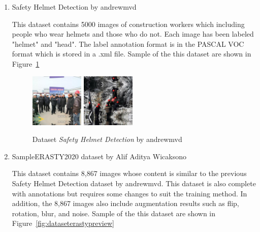 \begin{enumerate}
  \item Safety Helmet Detection by andrewmvd
  \par This dataset contains 5000 images of construction workers which including people who wear helmets and those who do not.  Each image has been labeled "helmet" and "head". The label annotation format is in the PASCAL VOC format which is stored in a .xml file. Sample of the this dataset are shown in Figure~\ref{fig:datasethelmetdetectionpreview}

  \begin{figure}[ht]
    \centering
    \includegraphics[width=0.24\textwidth]{gambar/sample_kaggle1/hard_hat_workers0.png}
    \includegraphics[width=0.24\textwidth]{gambar/sample_kaggle1/hard_hat_workers1.png}
    \caption{Dataset \emph{Safety Helmet Detection} by andrewmvd}
    \label{fig:datasethelmetdetectionpreview}  
  \end{figure}

  \item SampleERASTY2020 dataset by Alif Aditya Wicaksono
  \par This dataset contains 8,867 images whose content is similar to the previous Safety Helmet Detection dataset by andrewmvd. This dataset is also complete with annotations but requires some changes to suit the training method. In addition, the 8,867 images also include augmentation results such as flip, rotation, blur, and noise. Sample of the this dataset are shown in Figure~\ref{fig:dataseterastypreview}


\end{enumerate}

